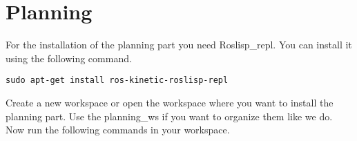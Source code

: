 \documentclass[main.tex]{subfiles}
\begin{document}
	\section{Planning}
	\label{sec:Planning}
	For the installation of the planning part you need Roslisp\_repl.
	You can install it using the following command.
	\begin{lstlisting}
sudo apt-get install ros-kinetic-roslisp-repl 
\end{lstlisting}

	Create a new workspace or open the workspace where you want to install the planning part. Use the planning\_ws if you want to organize them like we do. Now run the following commands in your workspace.\\
\begin{mdframed}[backgroundcolor=mygray, rightline=false]

\end{mdframed}
	
	
\end{document}
